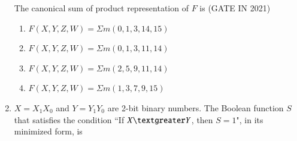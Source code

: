 \begin{enumerate}[label=\arabic*.,ref=\theenumi]
The canonical sum of product representation of $F$ is
\hfill (GATE IN 2021)
\begin{enumerate}
  \item $F(X, Y, Z, W) = \Sigma m(0,1,3,14,15)$
  \item $F(X, Y, Z, W) = \Sigma m(0,1,3,11,14)$
  \item $F(X, Y, Z, W) = \Sigma m(2,5,9,11,14)$
  \item $F(X, Y, Z, W) = \Sigma m(1,3,7,9,15)$
\end{enumerate}
\begin{figure}[H]
	\centering
	\resizebox{0.5\columnwidth}{!}{%

	}
\caption{}
\label{fig:4MUX}
\end{figure}
%
            \item 
            \label{prob:gate IN 35}
            $X = X_1X_0$ and $Y = Y_1Y_0$ are 2-bit binary numbers. The Boolean function $S$ that satisfies the condition ``If $X \textgreater Y$, then $S= 1$", in its minimized form, is 
                  \begin{enumerate}
 

\end{enumerate}
\end{enumerate}
